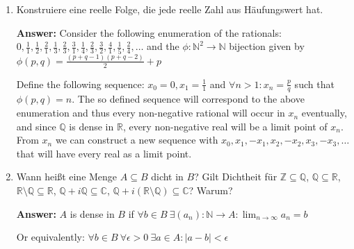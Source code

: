\documentclass[11pt]{article}
\newcommand{\abs}[1]{\left|#1\right|}
\newcommand{\RR}[0]{\mathbb{R}}
\newcommand{\CC}[0]{\mathbb{C}}
\newcommand{\QQ}[0]{\mathbb{Q}}
\newcommand{\ZZ}[0]{\mathbb{Z}}
\newcommand{\NN}[0]{\mathbb{N}}
\begin{document}
\begin{enumerate}
    \item Konstruiere eine reelle Folge, die jede reelle Zahl aus Häufungswert hat.

    \textbf{Answer:} Consider the following enumeration of the rationals: $0, \frac{1}{1}, \frac{1}{2}, \frac{2}{1}, \frac{1}{3}, \frac{2}{3}, \frac{3}{1}, \frac{1}{4}, \frac{2}{3}, \frac{3}{2}, \frac{4}{1}, \frac{1}{5}, \frac{2}{4}, \dots$
    and the $\phi\colon \NN^2 \to \NN$ bijection given by $\phi(p, q) = \frac{(p + q -1)(p + q - 2)}{2} + p$

    Define the following sequence: $x_0 = 0, x_1 = \frac{1}{1}$ and $\forall n > 1\colon x_n = \frac{p}{q}$ such that $\phi(p, q) = n$. The so defined sequence will correspond to the above enumeration and thus every non-negative rational will occur in $x_n$ eventually, and since $\QQ$ is dense in $\RR$, every non-negative real will be a limit point of $x_n$. From $x_n$ we can construct a new sequence with $x_0, x_1, -x_1, x_2, -x_2, x_3, -x_3, \dots$ that will have every real as a limit point.

    \item Wann heißt eine Menge $A \subseteq B$ dicht in $B$? Gilt Dichtheit für $\ZZ \subseteq \QQ$, $\QQ \subseteq \RR$, $\RR \setminus \QQ \subseteq \RR$, $\QQ + i\QQ \subseteq \CC$, $\QQ + i(\RR\setminus\QQ) \subseteq \CC$? Warum?

    \textbf{Answer:} $A$ is dense in $B$ if $\forall b \in B~\exists (a_n)\colon \NN \to A\colon \lim_{n\to\infty} a_n = b$

    Or equivalently: $\forall b \in B~\forall \epsilon > 0~\exists a \in A\colon \abs{a -b} < \epsilon$


\end{enumerate}
\end{document}
